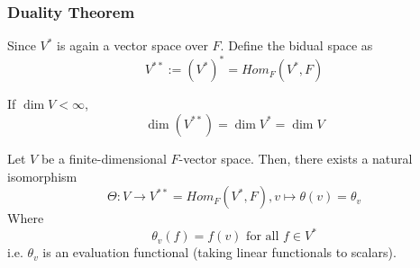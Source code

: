\subsubsection{Duality Theorem}

\begin{definition}
    Since $V^*$ is again a vector space over $F$. Define the bidual space as 
    \[
        V^{**} := (V^*)^* = Hom_F (V^*, F)
    \]
\end{definition}

\begin{remark}      
    If $\dim V < \infty$, 
    \[
        \dim (V^{**}) = \dim V^* = \dim V
    \]
\end{remark}        

\begin{theorem}
    Let $V$ be a finite-dimensional $F$-vector space. Then, there exists a natural isomorphism 
    \[
        \Theta: V \to V^{**} = Hom_F(V^*, F), v \mapsto \theta(v) = \theta_v
    \]
    Where 
    \[
        \theta_v(f) = f(v) \text{ for all } f \in V^*
    \]
    i.e. $\theta_v$ is an evaluation functional (taking linear functionals to scalars).
\end{theorem}


\newpage














